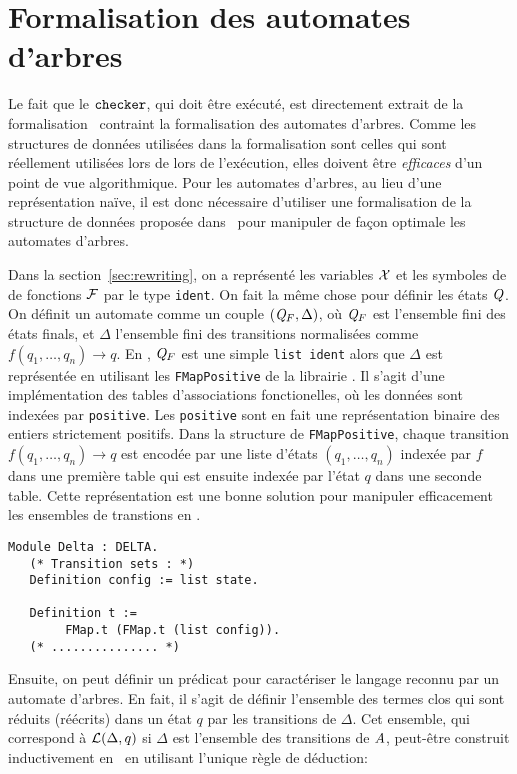 \section{Formalisation des automates d'arbres}
\label{sec:automata}

Le fait que le $\mathtt{checker}$, qui doit être exécuté, est directement extrait de la formalisation \coq\
contraint la formalisation des automates d'arbres. Comme les structures de données
utilisées dans la formalisation sont celles qui sont réellement utilisées
lors de lors de l'exécution, elles doivent être {\em efficaces} d'un point de vue algorithmique.
Pour les automates d'arbres, au lieu d'une représentation naïve, il est donc nécessaire d'utiliser 
une formalisation de la structure de données proposée dans~\cite{RivalGL-TPHOL01} pour manipuler de 
façon optimale les automates d'arbres.

\switchlstcoq


Dans la section~\ref{sec:rewriting}, on a représenté les variables $\mathcal X$ et les symboles de 
de fonctions $\mathcal{F}$ par le type \lstinline!ident!. On fait la même chose pour définir les états $\mathit Q$.
On définit un automate comme un couple $(\mathit Q_F, \Delta)$, où $\mathit Q_F$ est l'ensemble fini des 
états finals, et $\Delta$ l'ensemble fini des transitions normalisées comme $f(q_1, \dots, q_n) \rightarrow q$.
En \coq, $\mathit Q_F$ est une simple \lstinline!list ident! alors que $\Delta$ est représentée en utilisant les \lstinline!FMapPositive!
de la librairie \coq. Il s'agit d'une implémentation des tables d'associations fonctionelles, où les données sont indexées par \lstinline!positive!.
Les \lstinline!positive! sont en fait une représentation binaire des entiers strictement positifs.
Dans la structure de \lstinline!FMapPositive!, chaque transition $f(q_1, \dots, q_n) \rightarrow q$ est encodée par une liste d'états $(q_1, \dots, q_n)$ indexée par $f$
dans une première table qui est ensuite indexée par l'état $q$ dans une seconde table. Cette représentation est une bonne 
solution pour manipuler efficacement les ensembles de transtions en \coq.
%
%

\begin{lstlisting}
Module Delta : DELTA.
   (* Transition sets : *)
   Definition config := list state.
   
   Definition t := 
        FMap.t (FMap.t (list config)).
   (* ............... *)
\end{lstlisting}

%
%
Ensuite, on peut définir un prédicat pour caractériser le langage reconnu par un automate d'arbres.
En fait, il s'agit de définir l'ensemble des termes clos qui sont réduits (réécrits) dans un état 
$q$ par les transitions de $\Delta$. Cet ensemble, qui correspond à $\mathcal{L}(\Delta,q)$ si $\Delta$ 
est l'ensemble des transitions de $\mathit A$, peut-être construit inductivement en \coq\ en utilisant l'unique règle de déduction:


